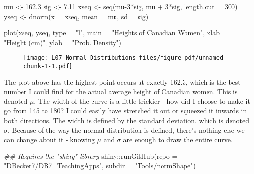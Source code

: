 \documentclass[
  letterpaper,
  DIV=11,
  numbers=noendperiod]{scrreprt}
\newenvironment{Shaded}{\begin{snugshade}}{\end{snugshade}}
\newcommand{\AttributeTok}[1]{\textcolor[rgb]{0.40,0.45,0.13}{#1}}
\newcommand{\DecValTok}[1]{\textcolor[rgb]{0.68,0.00,0.00}{#1}}
\newcommand{\DocumentationTok}[1]{\textcolor[rgb]{0.37,0.37,0.37}{\textit{#1}}}
\newcommand{\FloatTok}[1]{\textcolor[rgb]{0.68,0.00,0.00}{#1}}
\newcommand{\FunctionTok}[1]{\textcolor[rgb]{0.28,0.35,0.67}{#1}}
\newcommand{\NormalTok}[1]{\textcolor[rgb]{0.00,0.23,0.31}{#1}}
\newcommand{\OtherTok}[1]{\textcolor[rgb]{0.00,0.23,0.31}{#1}}
\newcommand{\SpecialCharTok}[1]{\textcolor[rgb]{0.37,0.37,0.37}{#1}}
\newcommand{\StringTok}[1]{\textcolor[rgb]{0.13,0.47,0.30}{#1}}
\begin{document}
\begin{Shaded}
\begin{Highlighting}[]
\NormalTok{mu }\OtherTok{\textless{}{-}} \FloatTok{162.3}
\NormalTok{sig }\OtherTok{\textless{}{-}} \FloatTok{7.11}
\NormalTok{xseq }\OtherTok{\textless{}{-}} \FunctionTok{seq}\NormalTok{(mu}\DecValTok{{-}3}\SpecialCharTok{*}\NormalTok{sig, mu }\SpecialCharTok{+} \DecValTok{3}\SpecialCharTok{*}\NormalTok{sig, }\AttributeTok{length.out =} \DecValTok{300}\NormalTok{)}
\NormalTok{yseq }\OtherTok{\textless{}{-}} \FunctionTok{dnorm}\NormalTok{(}\AttributeTok{x =}\NormalTok{ xseq, }\AttributeTok{mean =}\NormalTok{ mu, }\AttributeTok{sd =}\NormalTok{ sig) }

\FunctionTok{plot}\NormalTok{(xseq, yseq, }\AttributeTok{type =} \StringTok{"l"}\NormalTok{,}
  \AttributeTok{main =} \StringTok{"Heights of Canadian Women"}\NormalTok{,}
  \AttributeTok{xlab =} \StringTok{"Height (cm)"}\NormalTok{, }\AttributeTok{ylab =} \StringTok{"Prob. Density"}\NormalTok{)}
\end{Highlighting}
\end{Shaded}

\begin{figure}[H]

{\centering \texttt{[image: L07-Normal\_Distributions\_files/figure-pdf/unnamed-chunk-1-1.pdf]}

}

\end{figure}

The plot above has the highest point occurs at exactly 162.3, which is
the best number I could find for the actual average height of Canadian
women. This is denoted \(\mu\). The width of the curve is a little
trickier - how did I choose to make it go from 145 to 180? I could
easily have stretched it out or squeezed it inwards in both directions.
The width is defined by the standard deviation, which is denoted
\(\sigma\). Because of the way the normal distribution is defined,
there's nothing else we can change about it - knowing \(\mu\) and
\(\sigma\) are enough to draw the entire curve.

\begin{Shaded}
\begin{Highlighting}[]
\DocumentationTok{\#\# Requires the "shiny" library}
\NormalTok{shiny}\SpecialCharTok{::}\FunctionTok{runGitHub}\NormalTok{(}\AttributeTok{repo =} \StringTok{"DBecker7/DB7\_TeachingApps"}\NormalTok{, }
    \AttributeTok{subdir =} \StringTok{"Tools/normShape"}\NormalTok{)}
\end{Highlighting}
\end{Shaded}
\end{document}
